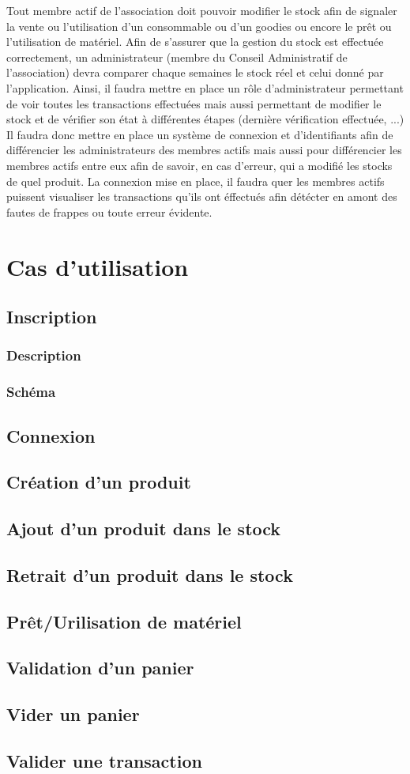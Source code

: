 \documentclass{article}
\begin{document}
  Tout membre actif de l’association doit pouvoir modifier le stock afin de signaler la vente ou l’utilisation d’un consommable ou d’un goodies ou encore le prêt ou l’utilisation de matériel. \newline
  Afin de s’assurer que la gestion du stock est effectuée correctement, un administrateur (membre du Conseil Administratif de l'association) devra comparer chaque semaines le stock réel et celui donné par l’application. \newline
  Ainsi, il faudra mettre en place un rôle d’administrateur permettant de voir toutes les transactions effectuées mais aussi permettant de modifier le stock et de vérifier son état à différentes étapes (dernière vérification effectuée, ...) \newline
  Il faudra donc mettre en place un système de connexion et d’identifiants afin de différencier les administrateurs des membres actifs mais aussi pour différencier les membres actifs entre eux afin de savoir, en cas d'erreur, qui a modifié les stocks de quel produit. \newline
  La connexion mise en place, il faudra quer les membres actifs puissent visualiser les transactions qu'ils ont éffectués afin détécter en amont des fautes de frappes ou toute erreur évidente.

\section{Cas d'utilisation }
  \subsection{Inscription}
    \subsubsection{Description}
    \subsubsection{Schéma}
  \subsection{Connexion}
  \subsection{Création d'un produit}
  \subsection{Ajout d'un produit dans le stock}
  \subsection{Retrait d'un produit dans le stock}
  \subsection{Prêt/Urilisation de matériel}
  \subsection{Validation d'un panier}
  \subsection{Vider un panier}
  \subsection{Valider une transaction}
\end{document}
